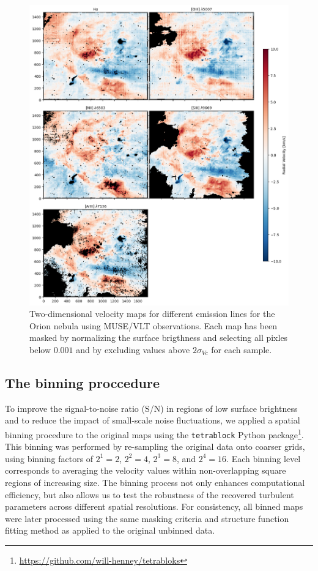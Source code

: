 \documentclass[fleqn,usenatbib, useAMS, a4paper]{mnras}
\begin{document}
\begin{figure}
 \centering
 \includegraphics[width=6in]{figures/velocity_maps_shared_cbar_fixed}\par
 \caption{
 Two-dimensional velocity maps for different emission lines for the Orion nebula using MUSE/VLT observations. Each map has been masked by normalizing the surface brigthness and selecting all pixles below $0.001$ and by excluding values above $2 \sigma_{Vc}$ for each sample. 
 }
\label{fig:figures/velocity_maps_shared_cbar_fixed}
\end{figure}

\subsection{The binning proccedure}

To improve the signal-to-noise ratio (S/N) in regions of low surface brightness and to reduce the impact of small-scale noise fluctuations, we applied a spatial binning procedure to the original maps using the \texttt{tetrablock} Python package\footnote{\url{https://github.com/will-henney/tetrabloks}}.
This binning was performed by re-sampling the original data onto coarser grids, using binning factors of $2^1 = 2$, $2^2 = 4$, $2^3 = 8$, and $2^4 = 16$. 
Each binning level corresponds to averaging the velocity values within non-overlapping square regions of increasing size. 
The binning process not only enhances computational efficiency, but also allows us to test the robustness of the recovered turbulent parameters across different spatial resolutions. For consistency, all binned maps were later processed using the same masking criteria and structure function fitting method as applied to the original unbinned data.
\end{document}
